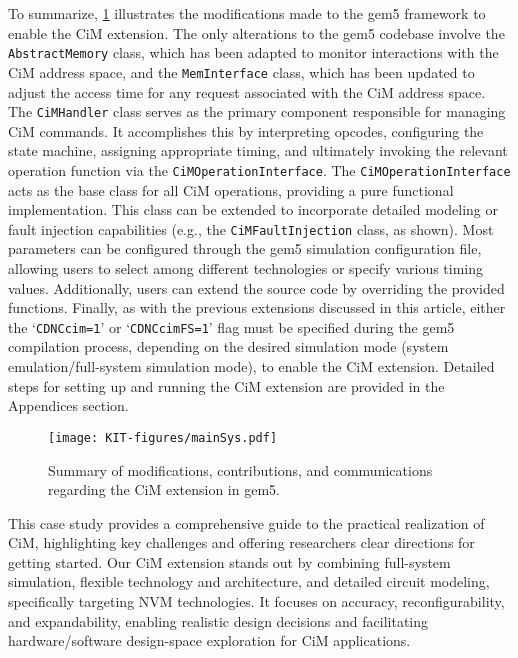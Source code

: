 To summarize, \cref{kit/fig3} illustrates the modifications made to the gem5 framework to enable the CiM extension. The only alterations to the gem5 codebase involve the \texttt{AbstractMemory} class, which has been adapted to monitor interactions with the CiM address space, and the \texttt{MemInterface} class, which has been updated to adjust the access time for any request associated with the CiM address space. The \texttt{CiMHandler} class serves as the primary component responsible for managing CiM commands. It accomplishes this by interpreting opcodes, configuring the state machine, assigning appropriate timing, and ultimately invoking the relevant operation function via the \texttt{CiMOperationInterface}.
The \texttt{CiMOperationInterface} acts as the base class for all CiM operations, providing a pure functional implementation. This class can be extended to incorporate detailed modeling or fault injection capabilities (e.g., the \texttt{CiMFaultInjection} class, as shown). Most parameters can be configured through the gem5 simulation configuration file, allowing users to select among different technologies or specify various timing values. Additionally, users can extend the source code by overriding the provided functions.
Finally, as with the previous extensions discussed in this article, either the `\texttt{CDNCcim=1}' or `\texttt{CDNCcimFS=1}' flag must be specified during the gem5 compilation process, depending on the desired simulation mode (system emulation/full-system simulation mode), to enable the CiM extension.
Detailed steps for setting up and running the CiM extension are provided in the Appendices section.


\begin{figure}[h]
	\centering
	\texttt{[image: KIT-figures/mainSys.pdf]}
	\caption{Summary of modifications, contributions, and communications regarding the CiM extension in gem5.}
	\label{kit/fig3}
\end{figure}

\begin{insightbox}
	This case study provides a comprehensive guide to the practical realization of CiM, highlighting key challenges and offering researchers clear directions for getting started.
	Our CiM extension stands out by combining full-system simulation, flexible technology and architecture, and detailed circuit modeling, specifically targeting NVM technologies.
	It focuses on accuracy, reconfigurability, and expandability, enabling realistic design decisions and facilitating hardware/software design-space exploration for CiM applications.
\end{insightbox}

